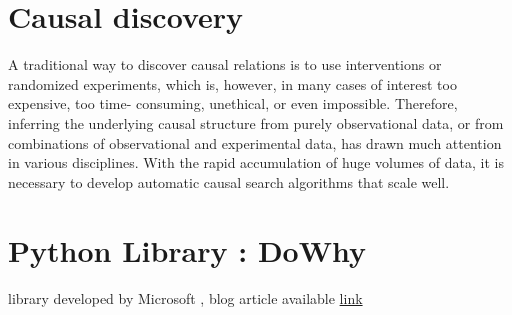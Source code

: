 \documentclass{article}
\begin{document}
\newpage

\section{Causal discovery}

A traditional way to discover causal relations is to use interventions or randomized experiments, which is, however, in many cases of interest too expensive, too time- consuming, unethical, or even impossible. Therefore, inferring the underlying causal structure from purely observational data, or from combinations of observational and experimental data, has drawn much attention in various disciplines. With the rapid accumulation of huge volumes of data, it is necessary to develop automatic causal search algorithms that scale well.\cite{10.3389/fgene.2019.00524}


\section{Python Library : DoWhy}
library developed by Microsoft \cite{dowhy}, blog article available \href{https://www.microsoft.com/en-us/research/blog/dowhy-a-library-for-causal-inference/}{link}


\newpage
\nocite{*}    %

\end{document}
